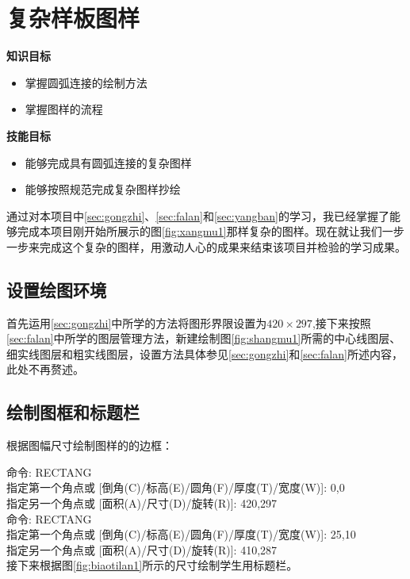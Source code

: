 
\section{复杂样板图样}

{\bfseries 知识目标}
\begin{itemize}
\item 掌握圆弧连接的绘制方法
\item 掌握图样的流程
\end{itemize}

{\bfseries 技能目标}
\begin{itemize}
\item 能够完成具有圆弧连接的复杂图样
\item 能够按照规范完成复杂图样抄绘
\end{itemize}

通过对本项目中\ref{sec:gongzhi}、\ref{sec:falan}和\ref{sec:yangban}的学习，我已经掌握了能够完成本项目刚开始所展示的图\ref{fig:xangmu1}那样复杂的图样。现在就让我们一步一步来完成这个复杂的图样，用激动人心的成果来结束该项目并检验的学习成果。
\subsection{设置绘图环境}
首先运用\ref{sec:gongzhi}中所学的方法将图形界限设置为$420\times 297$,接下来按照\ref{sec:falan}中所学的图层管理方法，新建绘制图\ref{fig:shangmu1}所需的中心线图层、细实线图层和粗实线图层，设置方法具体参见\ref{sec:gongzhi}和\ref{sec:falan}所述内容，此处不再赘述。
\subsection{绘制图框和标题栏}
根据图幅尺寸绘制图样的的边框：

\noindent
命令: RECTANG\\
指定第一个角点或 [倒角(C)/标高(E)/圆角(F)/厚度(T)/宽度(W)]: 0,0\\
指定另一个角点或 [面积(A)/尺寸(D)/旋转(R)]: 420,297\\
命令: RECTANG\\
指定第一个角点或 [倒角(C)/标高(E)/圆角(F)/厚度(T)/宽度(W)]: 25,10\\
指定另一个角点或 [面积(A)/尺寸(D)/旋转(R)]: 410,287\\

\indent
接下来根据图\ref{fig:biaotilan1}所示的尺寸绘制学生用标题栏。

